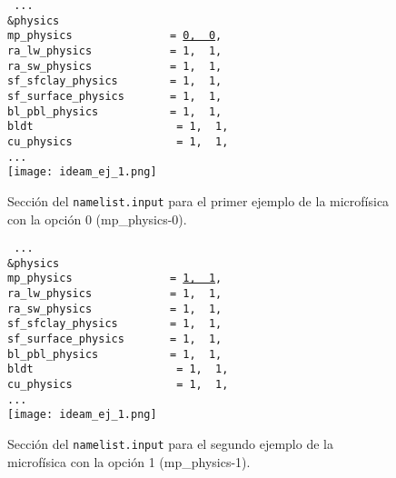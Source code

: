 \begin{itemize}
\begin{figure}[H]
\center
\texttt{
...\\
\&physics\\
mp\_physics~~~~~~~~~~~~~~~=~\underline{0,~~0},\\
ra\_lw\_physics~~~~~~~~~~~~=~1,~~1,\\
ra\_sw\_physics~~~~~~~~~~~~=~1,~~1,\\
sf\_sfclay\_physics~~~~~~~~=~1,~~1,\\
sf\_surface\_physics~~~~~~~=~1,~~1,\\
bl\_pbl\_physics~~~~~~~~~~~=~1,~~1,\\
bldt~~~~~~~~~~~~~~~~~~~~~~=~1,~~1,\\
cu\_physics~~~~~~~~~~~~~~~~=~1,~~1,\\
...\\
}
\centering
\texttt{[image: ideam\_ej\_1.png]}
\caption{Sección del \texttt{namelist.input} para el primer ejemplo de la microfísica con la opción 0 (mp\_physics-0).}
\label{imag_tab_ej2}

\end{figure}



\begin{figure}[H]

\center
\texttt{
...\\
\&physics\\
mp\_physics~~~~~~~~~~~~~~~=~\underline{1,~~1},\\
ra\_lw\_physics~~~~~~~~~~~~=~1,~~1,\\
ra\_sw\_physics~~~~~~~~~~~~=~1,~~1,\\
sf\_sfclay\_physics~~~~~~~~=~1,~~1,\\
sf\_surface\_physics~~~~~~~=~1,~~1,\\
bl\_pbl\_physics~~~~~~~~~~~=~1,~~1,\\
bldt~~~~~~~~~~~~~~~~~~~~~~=~1,~~1,\\
cu\_physics~~~~~~~~~~~~~~~~=~1,~~1,\\
...\\
}
\centering
\texttt{[image: ideam\_ej\_1.png]}
\caption{Sección del \texttt{namelist.input} para el segundo ejemplo de la microfísica con la opción 1 (mp\_physics-1).}
\label{imag_tab_ej3}


\end{figure}


\begin{figure}[H]


\end{figure}
\end{itemize}

